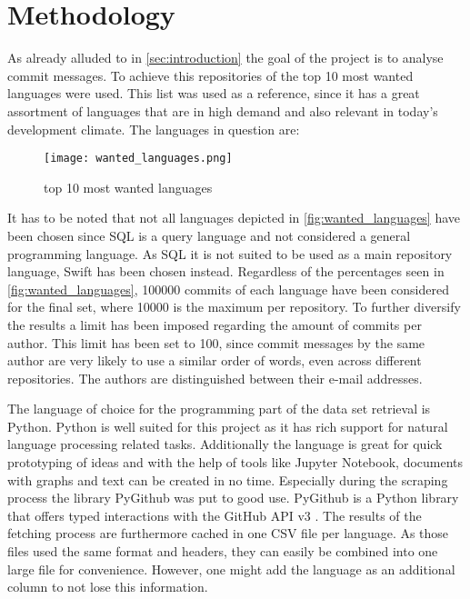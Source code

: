 \section{Methodology}
\label{sec:methodology}

As already alluded to in \autoref{sec:introduction} the goal of the project is to
analyse commit messages. To achieve this repositories of the top 10 most
wanted languages were used. This list was used as a reference, since it
has a great assortment of languages that are in high demand and also relevant
in today's development climate. The languages in question are:

\begin{figure}[H]
  \centering
  \texttt{[image: wanted\_languages.png]}
  \caption{top 10 most wanted languages \cite{so-survey}}
  \label{fig:wanted_languages}
\end{figure}

It has to be noted that not all languages depicted in
\autoref{fig:wanted_languages} have been chosen since SQL is a query language
and not considered a general programming language. As SQL it is not
suited to be used as a main repository language, Swift has been chosen instead.
Regardless of the percentages seen in \autoref{fig:wanted_languages}, 100000 commits of each
language have been considered for the final set, where 10000 is the maximum per
repository. To further diversify the results a limit has been imposed regarding
the amount of commits per author. This limit has been set to 100, since commit
messages by the same author are very likely to use a similar order of words,
even across different repositories. The authors are distinguished between their
e-mail addresses.

The language of choice for the programming part of the data set retrieval
is Python. Python is well suited for this project as it has rich support for
natural language processing related tasks. Additionally the language is great
for quick prototyping of ideas and with the help of tools like Jupyter
Notebook, documents with graphs and text can be created in no time. Especially
during the scraping process the library PyGithub was put to good use. PyGithub
is a Python library that offers typed interactions with the GitHub API v3
\cite{pygithub}. The results of the fetching process are furthermore cached in
one CSV file per language. As those files used the same format and headers, they
can easily be combined into one large file for convenience. However, one might
add the language as an additional column to not lose this information.

